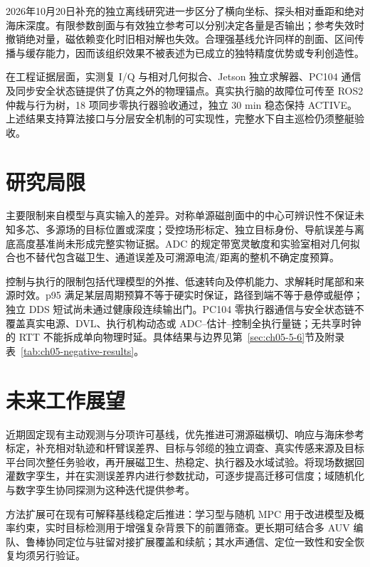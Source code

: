 2026年10月20日补充的独立离线研究进一步区分了横向坐标、探头相对垂距和绝对海床深度。有限参数剖面与有效独立参考可以分别决定各量是否输出；参考失效时撤销绝对量，磁依赖变化时旧相对解也失效。合理强基线允许同样的剖面、区间传播与缓存能力，因而该组织效果不被表述为已成立的独特精度优势或专利创造性。

在工程证据层面，实测复 I/Q 与相对几何拟合、Jetson 独立求解器、PC104 通信及同步安全状态链提供了仿真之外的物理锚点。真实执行脑的故障位可传至 ROS2 仲裁与行为树，18 项同步零执行器验收通过，独立 30 min 稳态保持 ACTIVE。上述结果支持算法接口与分层安全机制的可实现性，完整水下自主巡检仍须整艇验收。

\section{研究局限}\label{sec:ch06-6-2}

主要限制来自模型与真实输入的差异。对称单源磁剖面中的中心可辨识性不保证未知多芯、多源场的目标位置或深度；受控场形标定、独立目标身份、导航误差与离底高度基准尚未形成完整实物证据。ADC 的规定带宽灵敏度和实验室相对几何拟合也不替代包含磁卫生、通道误差及可溯源电流/距离的整机不确定度预算。

控制与执行的限制包括代理模型的外推、低速转向及停机能力、求解耗时尾部和来源时效。p95 满足某层周期预算不等于硬实时保证，路径到端不等于悬停或艇停；独立 DDS 短试尚未通过健康段连续输出门。PC104 零执行器通信与安全状态链不覆盖真实电源、DVL、执行机构动态或 ADC--估计--控制全执行量链；无共享时钟的 RTT 不能拆成单向物理时延。具体结果与边界见第~\ref{sec:ch05-5-6}节及附录表~\ref{tab:ch05-negative-results}。

\section{未来工作展望}\label{sec:ch06-6-3}

近期固定现有主动观测与分项许可基线，优先推进可溯源磁横切、响应与海床参考标定，补充相对轨迹和杆臂误差界、目标与邻缆的独立调查、真实传感来源及目标平台同次整任务验收，再开展磁卫生、热稳定、执行器及水域试验。将现场数据回灌数字孪生，并在实测误差界内进行参数扰动，可逐步提高迁移可信度；域随机化与数字孪生协同探测为这种迭代提供参考\cite{tobin2017domain,yan2026digitaltwin}。

方法扩展可在现有可解释基线稳定后推进：学习型与随机 MPC 用于改进模型及概率约束\cite{hewing2020learning,zarrouki2024stochastic}，实时目标检测用于增强复杂背景下的前置筛查\cite{bodenmann2024realtime}。更长期可结合多 AUV 编队、鲁棒协同定位与驻留对接扩展覆盖和续航\cite{yan2023formation,li2025cooplocalization,curtin2018resident}；其水声通信、定位一致性和安全恢复均须另行验证。
